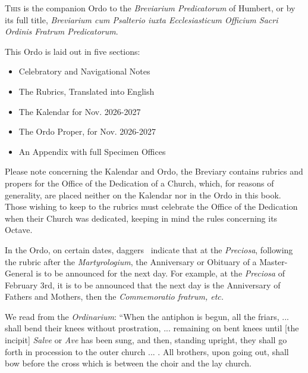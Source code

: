 \clearpage
{}


\lettrine[lines=2]{\zallmancaps \color{Red} T}{his} is the companion Ordo to the \emph{Breviarium Predicatorum} of Humbert, or by its full title, \emph{Breviarium cum Psalterio iuxta Ecclesiasticum Officium Sacri Ordinis Fratrum Predicatorum}.

\par This Ordo is laid out in five sections:
\begin{itemize}
\item Celebratory and Navigational Notes
\item The Rubrics, Translated into English
\item The Kalendar for Nov. 2026-2027
\item The Ordo Proper, for Nov. 2026-2027
\item An Appendix with full Specimen Offices
\end{itemize}


Please note concerning the Kalendar and Ordo, the Breviary contains rubrics and propers for the Office of the Dedication of a Church, which, for reasons of generality, are placed neither on the Kalendar nor in the Ordo in this book. Those wishing to keep to the rubrics must celebrate the Office of the Dedication when their Church was dedicated, keeping in mind the rules concerning its Octave.

In the Ordo, on certain dates, daggers \textdagger \ indicate that at the \emph{Preciosa}, following the rubric after the \emph{Martyrologium}, the Anniversary or Obituary of a Master-General is to be announced for the next day. For example, at the \emph{Preciosa} of February 3rd, it is to be announced that the next day is the Anniversary of Fathers and Mothers, then the \emph{Commemoratio fratrum, etc.}



We read from the \emph{Ordinarium}: ``When the antiphon is begun, all the friars, ... shall bend their knees without prostration, ... remaining on bent knees until [the incipit] \emph{Salve} or \emph{Ave} has been sung, and then, standing upright, they shall go forth in procession to the outer church ... . All brothers, upon going out, shall bow before the cross which is between the choir and the lay church.

